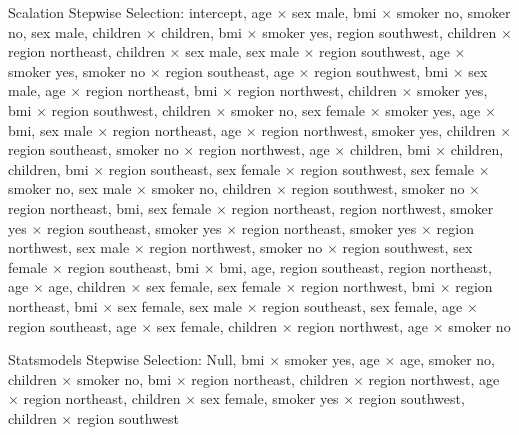 \documentclass{article}
\begin{document}
Scalation Stepwise Selection: intercept, age $\times$ sex male, bmi $\times$ smoker no, smoker no, sex male, children $\times$ children, bmi $\times$ smoker yes, region southwest, children $\times$ region northeast, children $\times$ sex male, sex male $\times$ region southwest, age $\times$ smoker yes, smoker no $\times$ region southeast, age $\times$ region southwest, bmi $\times$ sex male, age $\times$ region northeast, bmi $\times$ region northwest, children $\times$ smoker yes, bmi $\times$ region southwest, children $\times$ smoker no, sex female $\times$ smoker yes, age $\times$ bmi, sex male $\times$ region northeast, age $\times$ region northwest, smoker yes, children $\times$ region southeast, smoker no $\times$ region northwest, age $\times$ children, bmi $\times$ children, children, bmi $\times$ region southeast, sex female $\times$ region southwest, sex female $\times$ smoker no, sex male $\times$ smoker no, children $\times$ region southwest, smoker no $\times$ region northeast, bmi, sex female $\times$ region northeast, region northwest, smoker yes $\times$ region southeast, smoker yes $\times$ region northeast, smoker yes $\times$ region northwest, sex male $\times$ region northwest, smoker no $\times$ region southwest, sex female $\times$ region southeast, bmi $\times$ bmi, age, region southeast, region northeast, age $\times$ age, children $\times$ sex female, sex female $\times$ region northwest, bmi $\times$ region northeast, bmi $\times$ sex female, sex male $\times$ region southeast, sex female, age $\times$ region southeast, age $\times$ sex female, children $\times$ region northwest, age $\times$ smoker no

Statsmodels Stepwise Selection: Null, bmi $\times$ smoker yes, age $\times$ age, smoker no, children $\times$ smoker no, bmi $\times$ region northeast, children $\times$ region northwest, age $\times$ region northeast, children $\times$ sex female, smoker yes $\times$ region southwest, children $\times$ region southwest
\end{document}

